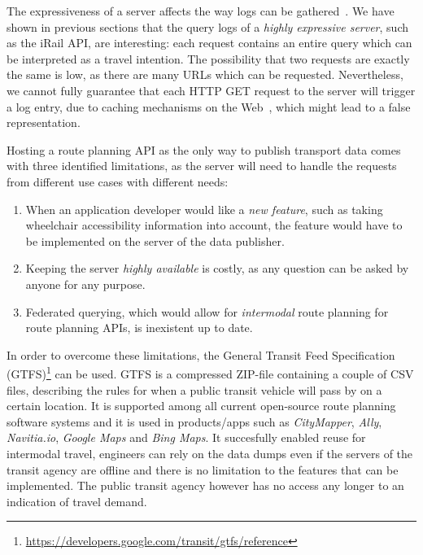 \documentclass{sig-alternate}
\begin{document}


The expressiveness of a server affects the way logs can be gathered~\cite{usewod2015}.
We have shown in previous sections that the query logs of a \emph{highly expressive server}, such as the iRail API, are interesting: each request contains an entire query which can be interpreted as a travel intention.
The possibility that two requests are exactly the same is low, as there are many URLs which can be requested.
Nevertheless, we cannot fully guarantee that each HTTP GET request to the server will trigger a log entry, due to caching mechanisms on the Web~\cite{fielding}, which might lead to a false representation.

Hosting a route planning API as the only way to publish transport data comes with three identified limitations, as the server will need to handle the requests from different use cases with different needs:
\begin{enumerate}
  \item When an application developer would like a \emph{new feature}, such as taking wheelchair accessibility information into account, the feature would have to be implemented on the server of the data publisher.
  \item Keeping the server \emph{highly available} is costly, as any question can be asked by anyone for any purpose.
  \item Federated querying, which would allow for \emph{intermodal} route planning for route planning APIs, is inexistent up to date.
\end{enumerate}

In order to overcome these limitations, the General Transit Feed Specification (GTFS)\footnote{\url{https://developers.google.com/transit/gtfs/reference}} can be used. 
GTFS is a compressed ZIP-file containing a couple of CSV files, describing the rules for when a public transit vehicle will pass by on a certain location.
It is supported among all current open-source route planning software systems and it is used in products/apps such as \emph{CityMapper}, \emph{Ally}, \emph{Navitia.io}, \emph{Google Maps} and \emph{Bing Maps}.
It succesfully enabled reuse for intermodal travel, engineers can rely on the data dumps even if the servers of the transit agency are offline and there is no limitation to the features that can be implemented.
The public transit agency however has no access any longer to an indication of travel demand.
\end{document}
